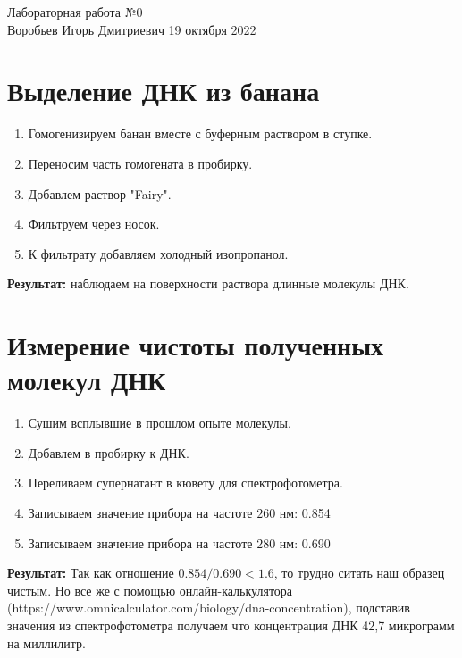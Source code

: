 \documentclass[12pt, letterpaper, twoside]{article}
\begin{document}
\begin{center}
	\LARGE{Лабораторная работа №0}\\[0.2cm]
	\large{Воробьев Игорь Дмитриевич}
	\large{19 октября 2022}
\end{center}

\section{Выделение ДНК из банана}
\begin{enumerate}
	\item Гомогенизируем банан вместе с буферным раствором в ступке.
	\item Переносим часть гомогената в пробирку.
	\item Добавлем раствор "Fairy".
	\item Фильтруем через носок.
	\item К фильтрату добавляем холодный изопропанол.
\end{enumerate}
\textbf{Результат:} наблюдаем на поверхности раствора длинные молекулы ДНК.

\section{Измерение чистоты полученных молекул ДНК}
\begin{enumerate}
	\item Сушим всплывшие в прошлом опыте молекулы.
	\item Добавлем  в пробирку к ДНК.
	\item Переливаем супернатант в кювету для спектрофотометра.
	\item Записываем значение прибора на частоте $260$ нм: 0.854
	
	\item Записываем значение прибора на частоте $280$ нм: 0.690
	
\end{enumerate}
\textbf{Результат:} Так как отношение $0.854 / 0.690 < 1.6$, то трудно ситать наш образец чистым. Но все же с помощью онлайн-калькулятора (https://www.omnicalculator.com/biology/dna-concentration), подставив значения из спектрофотометра получаем что концентрация ДНК 42,7 микрограмм на миллилитр.
\end{document}

